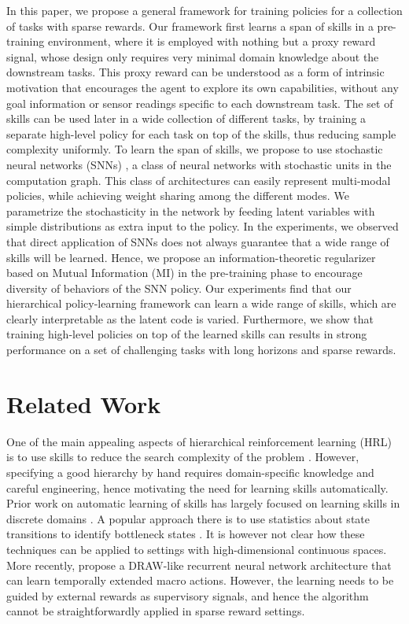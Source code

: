 \documentclass{article} %
\begin{document}
In this paper, we propose a general framework for training policies for a collection of tasks with sparse rewards.
Our framework first learns a span of skills in a pre-training environment, where it is employed with nothing but a proxy reward signal, whose design only requires very minimal domain knowledge about the downstream tasks. This proxy reward can be understood as a form of intrinsic motivation that encourages the agent to explore its own capabilities, without any goal information or sensor readings specific to each downstream task.
The set of skills can be used later in a wide collection of different tasks, by training a separate high-level policy for each task on top of the skills, thus reducing sample complexity uniformly.
To learn the span of skills, we propose to use stochastic neural networks (SNNs) \citep{neal1990learning, neal1992connectionist, Tang2014_FSNN}, a class of neural networks with stochastic units in the computation graph.
This class of architectures can easily represent multi-modal policies, while achieving weight sharing among the different modes.
We parametrize the stochasticity in the network by feeding latent variables with simple distributions as extra input to the policy.
In the experiments, we observed that direct application of SNNs does not always guarantee that a wide range of skills will be learned. 
Hence, we propose an information-theoretic regularizer based on Mutual Information (MI) in the pre-training phase to encourage diversity of behaviors of the SNN policy.
Our experiments find that our hierarchical policy-learning framework can learn a wide range of skills, which are clearly interpretable as the latent code is varied. Furthermore, we show that training high-level policies on top of the learned skills can results in strong performance on a set of challenging tasks with long horizons and sparse rewards.

\section{Related Work}

One of the main appealing aspects of hierarchical reinforcement learning (HRL) is to use skills to reduce the search complexity of the problem \citep{parr1998reinforcement, sutton1999between, dietterich2000hierarchical}.
However, specifying a good hierarchy by hand requires domain-specific knowledge and careful engineering, hence motivating the need for learning skills automatically. Prior work on automatic learning of skills has largely focused on learning skills in discrete domains \citep{chentanez2004intrinsically, vigorito2010intrinsically}.
A popular approach there is to use statistics about state transitions to identify bottleneck states \citep{stolle2002learning, mannor2004dynamic, csimcsek2005identifying}.
It is however not clear how these techniques can be applied to settings with high-dimensional continuous spaces.
More recently, \cite{mnih2016strategic} propose a DRAW-like \citep{gregor2015draw} recurrent neural network architecture that can learn temporally extended macro actions.
However, the learning needs to be guided by external rewards as supervisory signals, and hence the algorithm cannot be straightforwardly applied in sparse reward settings.
\end{document}
